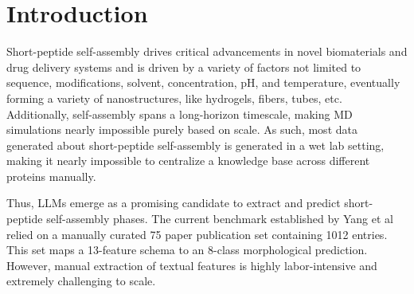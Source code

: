 \usetikzlibrary{shapes.geometric, positioning, arrows.meta}


\section{Introduction}
Short-peptide self-assembly drives critical advancements in novel biomaterials and drug delivery systems \cite{baral_assembly_2014} and is driven by a variety of factors not limited to sequence, modifications, solvent, concentration, pH, and temperature\cite{mukai_hydroorganohybrid_2013}, eventually forming a variety of nanostructures, like hydrogels, fibers, tubes, etc\cite{adler-abramovich_controlled_2008}. Additionally, self-assembly spans a long-horizon timescale, making MD simulations nearly impossible purely based on scale. As such, most data generated about short-peptide self-assembly is generated in a wet lab setting\cite{chandoliya_titanium_2024}, making it nearly impossible to centralize a knowledge base across different proteins manually. 

Thus, LLMs emerge as a promising candidate to extract and predict short-peptide self-assembly phases\cite{buehler_accelerating_2024}. The current benchmark established by Yang et al relied on a manually curated 75 paper publication set containing 1012 entries. This set maps a 13-feature schema to an 8-class morphological prediction. However, manual extraction of textual features is highly labor-intensive and extremely challenging to scale. 

